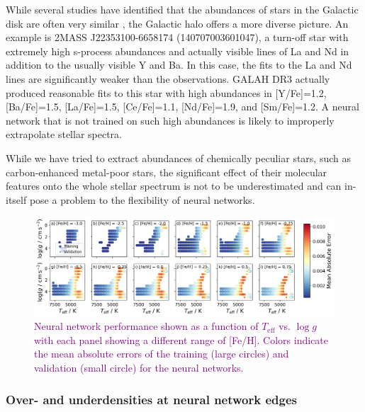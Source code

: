 \documentclass[
  journal=pasa,
  manuscript=research-paper, %
  year=2024,
  volume=37
]{cup-journal}
\newcommand{\adjusted}[1]{{\textcolor{purple}{#1}}}
\begin{document}
While several studies have identified that the abundances of stars in the Galactic disk are often very similar \citep[e.g.][]{Ness2019b}, the Galactic halo offers a more diverse picture. An example is 2MASS J22353100-6658174 (140707003601047), a turn-off star with extremely high s-process abundances and actually visible lines of La and Nd in addition to the usually visible Y and Ba. In this case, the fits to the La and Nd lines are significantly weaker than the observations. GALAH DR3 actually produced reasonable fits to this star with high abundances in [Y/Fe]=1.2, [Ba/Fe]=1.5, [La/Fe]=1.5, [Ce/Fe]=1.1, [Nd/Fe]=1.9, and [Sm/Fe]=1.2. A neural network that is not trained on such high abundances is likely to improperly extrapolate stellar spectra.

While we have tried to extract abundances of chemically peculiar stars, such as carbon-enhanced metal-poor stars, the significant effect of their molecular features onto the whole stellar spectrum is not to be underestimated and can in-itself pose a problem to the flexibility of neural networks.

\begin{figure}
    \centering
    \includegraphics[width=\textwidth]{figures/loss_teff_logg_feh.png}
    \caption{\adjusted{Neural network performance shown as a function of $T_\mathrm{eff}$ vs. $\log g$ with each panel showing a different range of [Fe/H]. Colors indicate the mean absolute errors of the training (large circles) and validation (small circle) for the neural networks.}}
    \label{fig:loss_teff_logg_feh}
\end{figure}

\subsubsection{Over- and underdensities at neural network edges}
\end{document}
